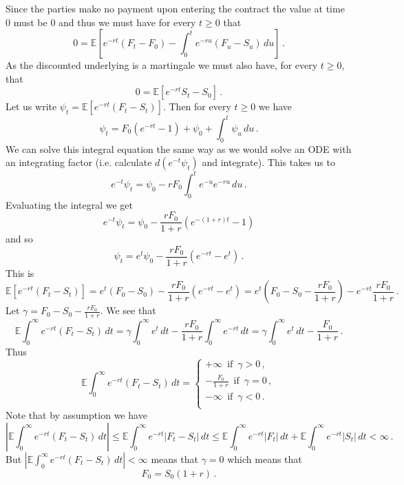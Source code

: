 \documentclass[10pt]{article}
\begin{document}
Since the parties make no payment upon entering the contract the value at time $0$ must be $0$ and thus we must have for every $t\geq 0$ that
\[
0 = \mathbb E \left[e^{-rt} (F_t-F_0) - \int_0^t e^{-ru}(F_u - S_u)\,du \right]\,.
\]
As the discounted underlying is a martingale we must also have, for every $t\geq 0$, that 
\[
0 = \mathbb E[e^{-rt}S_t - S_0]\,.
\]
Let us write $\psi_t = \mathbb E [e^{-rt}(F_t - S_t)]$. 
Then for every $t\geq 0$ we have  
\[
\psi_t = F_0(e^{-rt} - 1) + \psi_0 + \int_0^t \psi_u\,du\,.
\]
We can solve this integral equation the same way as we would solve an ODE with an integrating factor (i.e. calculate $d(e^{-t} \psi_t)$ and integrate). 
This takes us to 
\[
e^{-t}\psi_t = \psi_0 - r F_0 \int_0^t e^{-u}e^{-ru}\,du\,.
\]
Evaluating the integral we get
\[
e^{-t}\psi_t = \psi_0 - \frac{r F_0}{1+r} (e^{-(1+r)t} - 1)
\]
and so
\[
\psi_t = e^t \psi_0 - \frac{r F_0}{1+r} (e^{-rt} - e^t)\,.
\]
This is 
\[
\mathbb E [e^{-rt}(F_t - S_t)] = e^t(F_0-S_0) - \frac{r F_0}{1+r} (e^{-rt} - e^t)
= e^t\left(F_0 - S_0 - \frac{r F_0}{1+r} \right) - e^{-rt}\frac{r F_0}{1+r}\,.
\]
Let $\gamma = F_0 - S_0 - \frac{r F_0}{1+r}$. 
We see that
\[
\mathbb E \int_0^\infty e^{-rt}(F_t-S_t)\,dt = \gamma \int_0^\infty e^t\,dt - \frac{r F_0}{1+r}\int_0^\infty e^{-rt}\,dt = \gamma \int_0^\infty e^t\,dt - \frac{ F_0}{1+r}\,.
\]
Thus 
\[
\mathbb E \int_0^\infty e^{-rt}(F_t-S_t)\,dt = 
\left\{ 
\begin{split}
+\infty	\,\,\, \text{if}\,\,\, \gamma > 0\,,\\
- \frac{ F_0}{1+r} \,\,\, \text{if}\,\,\, \gamma = 0\,,\\
-\infty	\,\,\, \text{if}\,\,\, \gamma < 0\,.\\
\end{split}
\right.
\]
Note that by assumption we have 
\[
\left|\mathbb E \int_0^\infty e^{-rt}(F_t-S_t)\,dt\right| \leq \mathbb E\int_0^\infty e^{-rt}|F_t-S_t|\,dt \leq \mathbb E\int_0^\infty e^{-rt}|F_t|\,dt + \mathbb E\int_0^\infty e^{-rt}|S_t|\,dt < \infty\,.
\]
But $\left|\mathbb E \int_0^\infty e^{-rt}(F_t-S_t)\,dt\right| < \infty$ means that $\gamma = 0$ which means that 
\[
F_0 = S_0(1+r)\,.
\]
\end{document}
